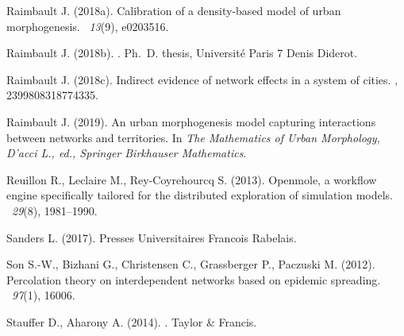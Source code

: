 \documentclass{article}
\begin{document}
\begin{thebibliography}{}
Raimbault J. (2018a).
\newblock Calibration of a density-based model of urban morphogenesis.
~{\em 13\/}(9), e0203516.


Raimbault J. (2018b).
.
\newblock Ph.\ D. thesis, Universit{\'e} Paris 7 Denis Diderot.


Raimbault J. (2018c).
\newblock Indirect evidence of network effects in a system of cities.
,
  2399808318774335.


Raimbault J. (2019).
\newblock An urban morphogenesis model capturing interactions between networks
  and territories.
\newblock In {\em The Mathematics of Urban Morphology, D'acci L., ed., Springer
  Birkhauser Mathematics}.


Reuillon R., Leclaire M., Rey-Coyrehourcq S. (2013).
\newblock Openmole, a workflow engine specifically tailored for the distributed
  exploration of simulation models.
~{\em 29\/}(8), 1981--1990.


Sanders L. (2017).
\newblock Presses Universitaires Francois Rabelais.


Son S.-W., Bizhani G., Christensen C., Grassberger P., Paczuski M. (2012).
\newblock Percolation theory on interdependent networks based on epidemic
  spreading.
~{\em 97\/}(1), 16006.


Stauffer D., Aharony A. (2014).
.
\newblock Taylor \& Francis.



\end{thebibliography}
\end{document}
